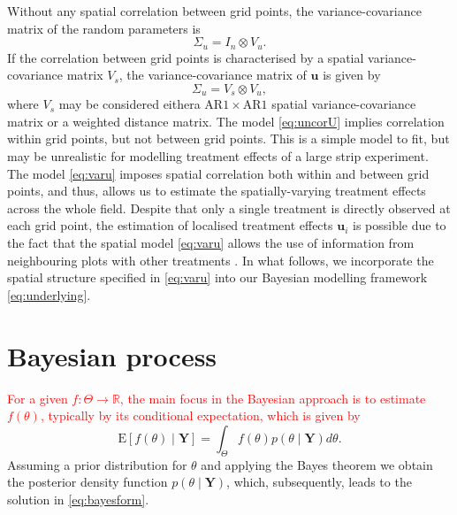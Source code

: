 \documentclass[a4paper]{article}   	%
\newcommand{\E}{\mathrm{E}}
\newcommand{\N}{\mathcal{N}}
\newcommand{\AR}{\mathrm{AR}1}
\begin{document}
	
	Without any spatial correlation between grid points, the variance-covariance matrix of the random parameters is
	\begin{equation}\label{eq:uncorU}
		\Sigma_u = I_n \otimes V_u.
	\end{equation}
	If the correlation between grid points is characterised by a spatial variance-covariance matrix $V_s$, the variance-covariance matrix of $\bm{u}$ is given by
	\begin{equation}\label{eq:varu}
		\Sigma_u = V_s \otimes V_u,
	\end{equation}
	where $V_s$ may be considered eithera $\AR\times \AR$ spatial variance-covariance  matrix or a weighted distance matrix.
	The model \eqref{eq:uncorU} implies correlation within grid points, but not between grid points. This is a simple model to fit, but may be unrealistic for modelling treatment effects of a large strip experiment. The model \eqref{eq:varu} imposes spatial correlation both within and between grid points, and thus, allows us to estimate the spatially-varying treatment effects across the whole field. Despite that only a single treatment is directly observed at each grid point, the estimation of localised treatment effects $\bm{u}_i$ is possible due to the fact that the spatial model \eqref{eq:varu} allows the use of information from neighbouring plots with other treatments \parencite{Piepho2011Statistical}. In what follows, we incorporate the spatial structure specified in \eqref{eq:varu} into our Bayesian modelling framework \eqref{eq:underlying}. 
	
	
	\section{Bayesian process}\label{sec:bayes}
	\textcolor{red}{For a given $f:\Theta \rightarrow \mathbb{R}$, the main focus in the Bayesian approach is to estimate $f(\theta)$, typically by its conditional expectation, which is given by }
	\begin{equation}\label{eq:bayesform}
		\E[f(\theta)\mid \bm{Y}] = \int_{\Theta} f(\theta)p(\theta\mid \bm{Y})d\theta.
	\end{equation}
	 Assuming a prior distribution for $\theta$ and applying the Bayes theorem we obtain the posterior density function $p(\theta\mid \bm{Y})$, which, subsequently, leads to the solution in \eqref{eq:bayesform}. 
	
\end{document}
